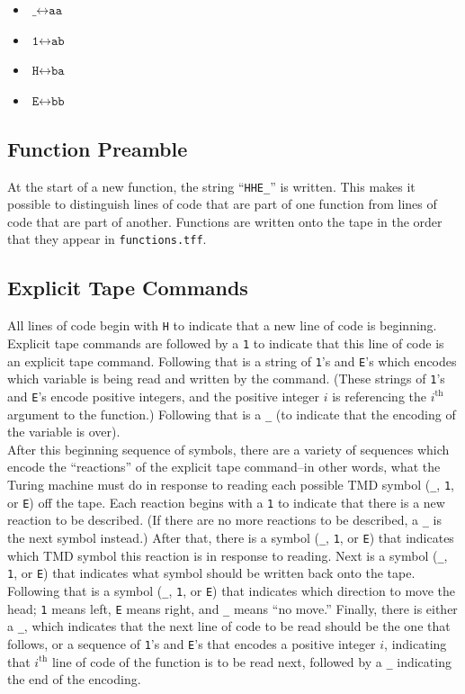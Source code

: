 \documentclass[11pt]{article}
\begin{document}
\begin{itemize}
\item $\texttt{\_} \leftrightarrow \texttt{aa}$
\item $\texttt{1} \leftrightarrow \texttt{ab}$
\item $\texttt{H} \leftrightarrow \texttt{ba}$
\item $\texttt{E} \leftrightarrow \texttt{bb}$
\end{itemize}

\subsection{Function Preamble}

At the start of a new function, the string ``\texttt{HHE_}'' is written. This makes it possible to distinguish lines of code that are part of one function from lines of code that are part of another. Functions are written onto the tape in the order that they appear in \texttt{functions.tff}.

\subsection{Explicit Tape Commands}

All lines of code begin with \texttt{H} to indicate that a new line of code is beginning. Explicit tape commands are followed by a \texttt{1} to indicate that this line of code is an explicit tape command. Following that is a string of \texttt{1}'s and \texttt{E}'s which encodes which variable is being read and written by the command. (These strings of \texttt{1}'s and \texttt{E}'s encode positive integers, and the positive integer $i$ is referencing the $i^\textrm{th}$ argument to the function.) Following that is a \texttt{_} (to indicate that the encoding of the variable is over). \\

After this beginning sequence of symbols, there are a variety of sequences which encode the ``reactions'' of the explicit tape command--in other words, what the Turing machine must do in response to reading each possible TMD symbol (\texttt{_}, \texttt{1}, or \texttt{E}) off the tape. Each reaction begins with a \texttt{1} to indicate that there is a new reaction to be described. (If there are no more reactions to be described, a \texttt{_} is the next symbol instead.) After that, there is a symbol (\texttt{_}, \texttt{1}, or \texttt{E}) that indicates which TMD symbol this reaction is in response to reading. Next is a symbol (\texttt{_}, \texttt{1}, or \texttt{E}) that indicates what symbol should be written back onto the tape. Following that is a symbol (\texttt{_}, \texttt{1}, or \texttt{E}) that indicates which direction to move the head; \texttt{1} means left, \texttt{E} means right, and \texttt{_} means ``no move.'' Finally, there is either a \texttt{_}, which indicates that the next line of code to be read should be the one that follows, or a sequence of \texttt{1}'s and \texttt{E}'s that encodes a positive integer $i$, indicating that $i^\textrm{th}$ line of code of the function is to be read next, followed by a \texttt{_} indicating the end of the encoding. \\
\end{document}
